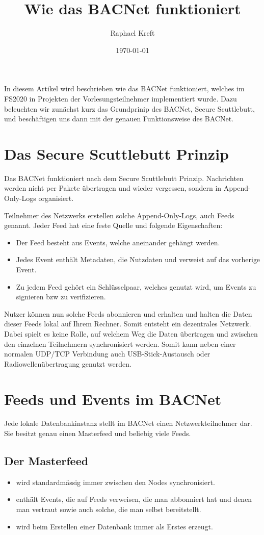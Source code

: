 \documentclass[a4paper, fontsize=9pt, oneside, headsepline=.5pt,footsepline=.5pt]{scrartcl}
\title{Wie das BACNet funktioniert}
\author{Raphael Kreft}
\date{\today}
\begin{document}
\maketitle
\tableofcontents
\clearpage
\setcounter{page}{1}

In diesem Artikel wird beschrieben wie das BACNet funktioniert, welches im FS2020 in Projekten der Vorlesungsteilnehmer implementiert wurde.
Dazu beleuchten wir zunächst kurz das Grundprinip des BACNet, Secure Scuttlebutt, und beschäftigen uns dann mit der genauen Funktionsweise des BACNet.

\section{Das Secure Scuttlebutt Prinzip}
Das BACNet funktioniert nach dem Secure Scuttlebutt Prinzip. Nachrichten werden nicht per Pakete übertragen und wieder vergessen, sondern in Append-Only-Logs organisiert.

Teilnehmer des Netzwerks erstellen solche Append-Only-Logs, auch Feeds genannt. Jeder Feed hat eine feste Quelle und folgende Eigenschaften:
\begin{itemize}
    \item Der Feed besteht aus Events, welche aneinander gehängt werden.
    \item Jedes Event enthält Metadaten, die Nutzdaten und verweist auf das vorherige Event.
    \item Zu jedem Feed gehört ein Schlüsselpaar, welches genutzt wird, um Events zu signieren bzw zu verifizieren.
\end{itemize}

Nutzer können nun solche Feeds abonnieren und erhalten und halten die Daten dieser Feeds lokal auf Ihrem Rechner. Somit entsteht ein dezentrales Netzwerk.
Dabei spielt es keine Rolle, auf welchem Weg die Daten übertragen und zwischen den einzelnen Teilnehmern synchronisiert werden. Somit kann neben einer normalen UDP/TCP Verbindung auch USB-Stick-Austausch oder Radiowellenübertragung genutzt werden.

\section{Feeds und Events im BACNet}
Jede lokale Datenbankinstanz stellt im BACNet einen Netzwerkteilnehmer dar. Sie besitzt genau einen Masterfeed und beliebig viele Feeds.
\subsection{Der Masterfeed}
\begin{itemize}
    \item wird standardmässig immer zwischen den Nodes synchronisiert.
    \item enthält Events, die auf Feeds verweisen, die man abbonniert hat und denen man vertraut sowie auch solche, die man selbst bereitstellt.
    \item wird beim Erstellen einer Datenbank immer als Erstes erzeugt.
\end{itemize}
\end{document}
